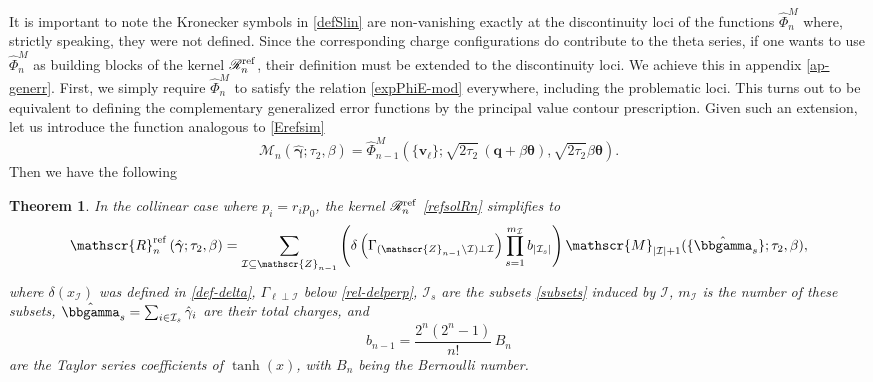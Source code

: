 \documentclass[12pt,letterpaper]{JHEP3}
\def\be{\begin{equation}}
\def\ee{\end{equation}}
\newtheorem{theorem}{Theorem}%
\def\({\left(}
\def\){\right)}
\newcommand{\cI}{\mathcal{I}}
\def\scR{\mathscr{R}}
\def\Mv{\mathscr{M}}
\def\Zv{\mathscr{Z}}
\newcommand{\bfv}{{\boldsymbol v}}
\newcommand{\bfq}{{\boldsymbol q}}
\newcommand{\bftet}{{\boldsymbol \theta}}
\newcommand{\bfgam}{{\boldsymbol \gamma}}
\def\hPhi{\hat\Phi}
\def\hgam{\hat\gamma}
\def\bfhgam{\hat\bfgam}
\def\scRrf{\scR^{\rm ref}}
\def\hbbgam{\hat\bbgamma}
\begin{document}
It is important to note the Kronecker symbols in \eqref{defSlin} are non-vanishing exactly at the discontinuity loci of the functions $\hPhi^M_n$ 
where, strictly speaking, they were not defined.
Since the corresponding charge configurations do contribute to the theta series, 
if one wants to use $\hPhi^M_n$ as building blocks of the kernel $\scRrf_n$, 
their definition must be extended to the discontinuity loci.
We achieve this in appendix \ref{ap-generr}.
First, we simply require $\hPhi^M_n$ to satisfy the relation \eqref{expPhiE-mod} everywhere, including the problematic loci.
This turns out to be equivalent to defining the complementary generalized error functions by the principal value contour prescription.
Given such an extension, let us introduce the function analogous to \eqref{Erefsim}
\be 
\Mv_n(\bfhgam;\tau_2,\beta)= \hPhi^M_{n-1}\(\{ \bfv_{\ell}\};\sqrt{2\tau_2}\,(\bfq+\beta\bftet ),\sqrt{2\tau_2}\beta\bftet\).
\label{vMdef}
\ee 
Then we have the following
\begingroup
\renewcommand{\thetheorem}{1a}
\begin{theorem}
\label{thm-simple-ref}
In the collinear case where $p_i=r_ip_0$, the kernel $\scRrf_n$ \eqref{refsolRn} simplifies to
\be
\scRrf_n\(\bfhgam;\tau_2,\beta\) =
\sum_{\cI\subseteq \Zv_{n-1}}
\( 
\delta\(\Gamma_{(\Zv_{n-1}\setminus\cI) \perp\cI}\)
\prod_{s=1}^{m_{\cI}} b_{|\cI_s|}\)
\Mv_{|\cI|+1}(\{\hbbgam_s\};\tau_2,\beta),
\label{refsolRn-simple-new}
\ee		
where $\delta(x_\cI)$ was defined in \eqref{def-delta}, $\Gamma_{\ell\perp\cI}$ below \eqref{rel-delperp},
$\cI_s$ are the subsets \eqref{subsets} induced by $\cI$, $m_{\cI}$ is the number of these subsets,
$\hbbgam_s=\sum_{i\in\cI_s}\hgam_i$ are their total charges, and
\be 
b_{n-1}=\frac{2^n(2^n-1)}{n!}\, B_n
\label{defbn}
\ee
are the Taylor series coefficients of $\tanh(x)$, with $B_n$ being the Bernoulli number.
\end{theorem}
\endgroup
\end{document}
